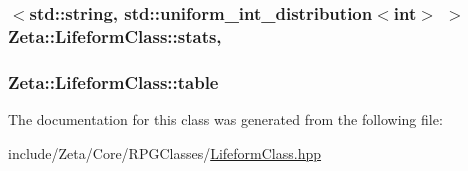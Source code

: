 \hypertarget{classZeta_1_1LifeformClass_a4451d269f7dc4c5544d8b89b63a420ca}{
\subsubsection[{stats}]{$<$std\+::string, std\+::uniform\+\_\+int\+\_\+distribution$<$int$>$ $>$ Zeta\+::\+Lifeform\+Class\+::stats\hspace{0.3cm}{\ttfamily [mutable]}, {\ttfamily [private]}}}\label{classZeta_1_1LifeformClass_a4451d269f7dc4c5544d8b89b63a420ca}
\hypertarget{classZeta_1_1LifeformClass_aa8731df77ae7bd670fea69e182266dd3}{
\subsubsection[{table}]{ Zeta\+::\+Lifeform\+Class\+::table\hspace{0.3cm}{\ttfamily [private]}}}\label{classZeta_1_1LifeformClass_aa8731df77ae7bd670fea69e182266dd3}


The documentation for this class was generated from the following file\+:\begin{DoxyCompactItemize}
\item 
include/\+Zeta/\+Core/\+R\+P\+G\+Classes/\hyperlink{LifeformClass_8hpp}{Lifeform\+Class.\+hpp}\end{DoxyCompactItemize}
